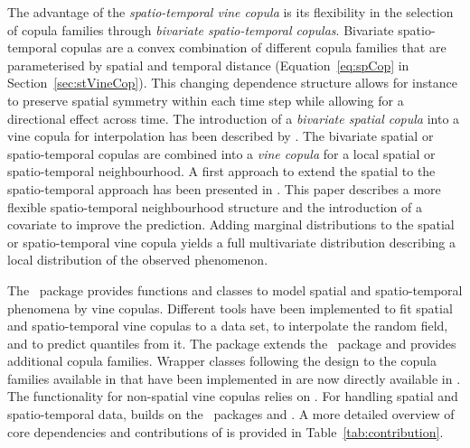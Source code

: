 \documentclass[article,nojss]{jss}
\begin{document}
The advantage of the \emph{spatio-temporal vine copula} is its flexibility in the selection of copula families through \emph{bivariate spatio-temporal copulas}. Bivariate spatio-temporal copulas are a convex combination of different copula families that are parameterised by spatial and temporal distance (Equation~\ref{eq:spCop} in Section~\ref{sec:stVineCop}). This changing dependence structure allows for instance to preserve spatial symmetry within each time step while allowing for a directional effect across time. The introduction of a \emph{bivariate spatial copula} into a vine copula for interpolation has been described by \citet{Graler2014}. The bivariate spatial or spatio-temporal copulas are combined into a \emph{vine copula} \citep[initially called \emph{pair-copula construction} by][]{Aas2009,Bedford2002} for a local spatial or spatio-temporal neighbourhood. A first approach to extend the spatial to the spatio-temporal approach has been presented in \citet{Graler2012a}. This paper describes a more flexible spatio-temporal neighbourhood structure and the introduction of a covariate to improve the prediction. Adding marginal distributions to the spatial or spatio-temporal vine copula yields a full multivariate distribution describing a local distribution of the observed phenomenon. 

The  ~package provides functions and classes to model spatial and spatio-temporal phenomena by vine copulas. Different tools have been implemented to fit spatial and spatio-temporal vine copulas to a data set, to interpolate the random field, and to predict quantiles from it. The package extends the  ~package \citep{Kojadinovic2010a,Yan2007} and provides additional copula families. Wrapper classes following the  design to the copula families available in  \citep{Schepsmeier2013} that have been implemented in  are now directly available in . The functionality for non-spatial vine copulas relies on . For handling spatial and spatio-temporal data,  builds on the ~packages  \citep{Pebesma2005} and  \citep{Pebesma2012}. A more detailed overview of core dependencies and contributions of  is provided in Table~\ref{tab:contribution}.
\end{document}
